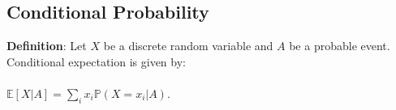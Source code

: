 \documentclass{article}
\begin{document}
		\subsection{Conditional Probability}
			\textbf{Definition}: Let $X$ be a discrete random variable and $A$ be a probable event. Conditional expectation is given by: \\
			\\
			\quad $\mathbb{E}[X|A] = \sum_i x_i \mathbb{P}(X = x_i | A)$. \\
			\\
\end{document}
